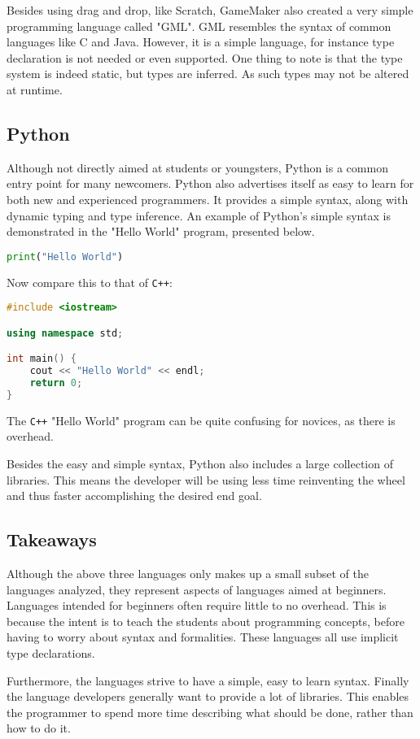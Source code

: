 Besides using drag and drop, like Scratch, GameMaker also created a very simple programming language called "GML".
GML resembles the syntax of common languages like C and Java. 
However, it is a simple language, for instance type declaration is not needed or even supported.
One thing to note is that the type system is indeed static, but types are inferred. 
As such types may not be altered at runtime\cite{GML}.

\subsection{Python}
Although not directly aimed at students or youngsters, Python is a common entry point for many newcomers. 
Python also advertises itself as easy to learn for both new and experienced programmers. 
It provides a simple syntax, along with dynamic typing and type inference\cite{PythonWebsite}.
An example of Python's simple syntax is demonstrated in the "Hello World" program, presented below.

\begin{lstlisting}[language=Python,label=lis:PythonHelloWorld,caption=Hello World in python]
print("Hello World")
\end{lstlisting}

Now compare this to that of \texttt{C++}:

\begin{lstlisting}[language=C++,label=lis:C++HelloWorld,caption=Hello World in C++]
#include <iostream>

using namespace std;

int main() {
	cout << "Hello World" << endl;
	return 0;
}
\end{lstlisting}

The \texttt{C++} "Hello World" program can be quite confusing for novices, as there is overhead.

Besides the easy and simple syntax, Python also includes a large collection of libraries\cite{PythonLibraries}.
This means the developer will be using less time reinventing the wheel and thus faster accomplishing the desired end goal\cite{PythonXKCD}.

\subsection{Takeaways}
Although the above three languages only makes up a small subset of the languages analyzed, they represent aspects of languages aimed at beginners.
Languages intended for beginners often require little to no overhead. 
This is because the intent is to teach the students about programming concepts, before having to worry about syntax and formalities. 
These languages all use implicit type declarations.

Furthermore, the languages strive to have a simple, easy to learn syntax. 
Finally the language developers generally want to provide a lot of libraries. 
This enables the programmer to spend more time describing what should be done, rather than how to do it.
